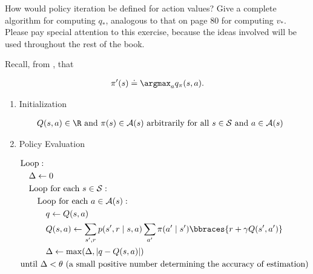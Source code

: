 
\begin{exercise}[Exercise 4.5]

How would policy iteration be defined for action values?
Give a complete algorithm for computing $q_\ast$, analogous to that on page 80 for computing $v_\ast$.
Please pay special attention to this exercise, because the ideas involved will be used throughout the rest of the book.

\end{exercise}


\begin{solution}

Recall, from \cite*[page 79]{SuttonRichardS2018Rl:a}, that

\begin{align*}
    \pi^\prime(s)
    \doteq
    \argmax_a q_\pi(s, a).
\end{align*}

\begin{tcolorbox}[title = Policy Iteration (using iterative policy evaluation) for estimating $\pi \approx \pi_\ast$]

    \begin{enumerate}[label = \arabic*.]

        \item Initialization
        
        \begin{align*}
            & Q(s, a) \in \R ~\text{and}~ \pi(s) \in \mathcal A(s) ~\text{arbitrarily for all}~ s \in \mathcal S ~\text{and}~ a \in \mathcal A(s)            
        \end{align*}

        \item Policy Evaluation
        
        \begin{align*}
            & \text{Loop}: \\
            & \quad \Delta \leftarrow 0 \\
            & \quad \text{Loop for each $s \in \mathcal S$}: \\
            & \quad \quad \text{Loop for each $a \in \mathcal A(s)$}: \\
            & \quad \quad \quad q \leftarrow Q(s, a) \\
            & \quad \quad \quad Q(s, a) \leftarrow \sum_{s^\prime, r} p(s^\prime, r \mid s, a) \sum_{a^\prime} \pi(a^\prime \mid s^\prime) \bbraces{r + \gamma Q(s^\prime, a^\prime)} \\
            & \quad \quad \quad \Delta \leftarrow \max(\Delta, |q - Q(s, a)|) \\
            & \text{until $\Delta < \theta$ (a small positive number determining the accuracy of estimation)}
        \end{align*}


\end{enumerate}
\end{tcolorbox}
\end{solution}
